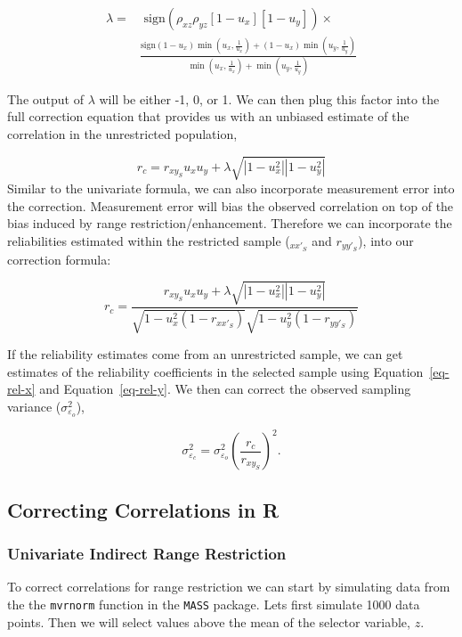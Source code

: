 \documentclass[
  letterpaper,
  DIV=11,
  numbers=noendperiod]{scrreprt}
\begin{document}
\begin{align}
\lambda =& \text{ sign}\left(\rho_{xz}\rho_{yz} [1-u_x][1-u_y]\right)\times \\
&\frac{\text{sign}
\left(1-u_x\right)\min\left(u_x,\frac{1}{u_x}\right) + 
\left(1-u_x\right)\min\left(u_y,\frac{1}{u_y}\right)
}{
\min\left(u_x,\frac{1}{u_x}\right)+\min\left(u_y,\frac{1}{u_y}\right)
}
\end{align}

The output of \(\lambda\) will be either -1, 0, or 1. We can then plug
this factor into the full correction equation that provides us with an
unbiased estimate of the correlation in the unrestricted population,

\[
r_c = r_{xy_S}u_xu_y+\lambda\sqrt{|1-u_x^2||1-u_y^2|}
\] Similar to the univariate formula, we can also incorporate
measurement error into the correction. Measurement error will bias the
observed correlation on top of the bias induced by range
restriction/enhancement. Therefore we can incorporate the reliabilities
estimated within the restricted sample (\(_{xx'_S}\) and \(r_{yy'_S}\)),
into our correction formula:

\[
r_c = \frac{r_{xy_S}u_xu_y+\lambda\sqrt{|1-u_x^2||1-u_y^2|}}{\sqrt{1-u_x^2(1-r_{xx'_S})}\sqrt{1-u_y^2(1-r_{yy'_S})}}
\]

If the reliability estimates come from an unrestricted sample, we can
get estimates of the reliability coefficients in the selected sample
using Equation~\ref{eq-rel-x} and Equation~\ref{eq-rel-y}. We then can
correct the observed sampling variance (\(\sigma^2_{\varepsilon_o}\)),

\[
\sigma^2_{\varepsilon_c} = \sigma^2_{\varepsilon_o}\left(\frac{r_c}{r_{xy_S}}\right)^2.
\]

\hypertarget{correcting-correlations-in-r-4}{%
\subsection{Correcting Correlations in
R}\label{correcting-correlations-in-r-4}}

\hypertarget{univariate-indirect-range-restriction}{%
\subsubsection*{Univariate Indirect Range
Restriction}\label{univariate-indirect-range-restriction}}

To correct correlations for range restriction we can start by simulating
data from the the \texttt{mvrnorm} function in the \texttt{MASS}
package. Lets first simulate 1000 data points. Then we will select
values above the mean of the selector variable, \(z\).
\end{document}
